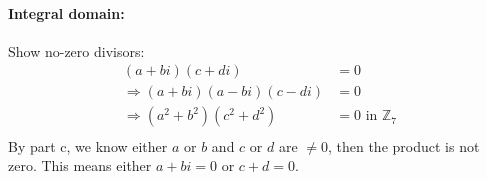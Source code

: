 \documentclass[12pt]{article}
\begin{document}
\begin{enumerate}
\begin{enumerate}
					\paragraph{Integral domain:} Show no-zero divisors:
					\begin{align*}
						(a+bi)(c+di) &= 0\\
						\Rightarrow (a+bi)(a-bi)(c-di) &= 0\\
						\Rightarrow (a^2+b^2)(c^2+d^2) &= 0 \text{ in } \mathbb{Z}_7\\
					\end{align*}
					By part c, we know either $a$ or $b$ and $c$ or $d$ are $\neq 0$, then
					the product is not zero. This means either $a+bi = 0$ or $c+d = 0$.
			\end{enumerate}

\end{enumerate}
\end{document}
